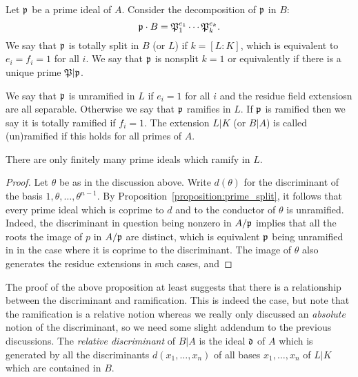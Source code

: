 \begin{definition}
  Let $\mathfrak{p}$ be a prime ideal of $A$.
  Consider the decomposition of $\mathfrak{p}$ in $B$:
  \[ \mathfrak{p} \cdot B = \mathfrak{P}_{1}^{e_{1}} \cdots \mathfrak{P}_{k}^{e_{k}}. \]
  We say that $\mathfrak{p}$ is totally split in $B$ (or $L$) if $k = [L:K]$, which is equivalent to $e_{i} = f_{i} = 1$ for all $i$.
  We say that $\mathfrak{p}$ is nonsplit $k = 1$ or equivalently if there is a unique prime $\mathfrak{P}|\mathfrak{p}$.
\end{definition}

\begin{definition}
  We say that $\mathfrak{p}$ is unramified in $L$ if $e_{i} = 1$ for all $i$ and the residue field extensiosn are all separable.
  Otherwise we say that $\mathfrak{p}$ ramifies in $L$.
  If $\mathfrak{p}$ is ramified then we say it is totally ramified if $f_{i} = 1$.
  The extension $L|K$ (or $B|A$) is called (un)ramified if this holds for all primes of $A$.
\end{definition}

\begin{proposition}
  There are only finitely many prime ideals which ramify in $L$.
\end{proposition}
\begin{proof}
  Let $\theta$ be as in the discussion above.
  Write $d(\theta)$ for the discriminant of the basis $1,\theta,\ldots,\theta^{n-1}$.
  By Proposition~\ref{proposition:prime_split}, it follows that every prime ideal which is coprime to $d$ and to the conductor of $\theta$ is unramified.
  Indeed, the discriminant in question being nonzero in $A/\mathfrak{p}$ implies that all the roots the image of $p$ in $A/\mathfrak{p}$ are distinct, which is equivalent $\mathfrak{p}$ being unramified in in the case where it is coprime to the discriminant.
  The image of $\theta$ also generates the residue extensions in such cases, and 
\end{proof}

The proof of the above proposition at least suggests that there is a relationship between the discriminant and ramification.
This is indeed the case, but note that the ramification is a relative notion whereas we really only discussed an \emph{absolute} notion of the discriminant, so we need some slight addendum to the previous discussions.
The \emph{relative discriminant} of $B|A$ is the ideal $\mathfrak{d}$ of $A$ which is generated by all the discriminants $d(x_{1},\ldots,x_{n})$ of all bases $x_{1},\ldots,x_{n}$ of $L|K$ which are contained in $B$.

